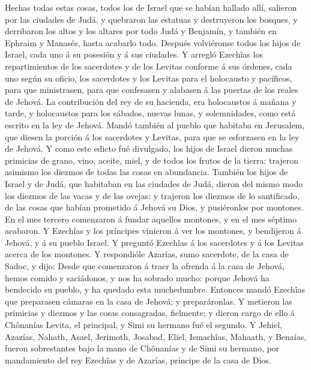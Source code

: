  Hechas todas estas cosas, todos los de Israel que se
habían hallado allí, salieron por las ciudades de Judá, y quebraron las
estatuas y destruyeron los bosques, y derribaron los altos y los altares
por todo Judá y Benjamín, y también en Ephraim y Manasés, hasta acabarlo
todo. Después volviéronse todos los hijos de Israel, cada uno á su
posesión y á sus ciudades.  Y arregló Ezechîas los
repartimientos de los sacerdotes y de los Levitas conforme á sus
órdenes, cada uno según su oficio, los sacerdotes y los Levitas para el
holocausto y pacíficos, para que ministrasen, para que confesasen y
alabasen á las puertas de los reales de Jehová.  La
contribución del rey de su hacienda, era holocaustos á mañana y tarde, y
holocaustos para los sábados, nuevas lunas, y solemnidades, como está
escrito en la ley de Jehová.  Mandó también al pueblo que
habitaba en Jerusalem, que diesen la porción á los sacerdotes y Levitas,
para que se esforzasen en la ley de Jehová.  Y como este
edicto fué divulgado, los hijos de Israel dieron muchas primicias de
grano, vino, aceite, miel, y de todos los frutos de la tierra: trajeron
asimismo los diezmos de todas las cosas en abundancia. 
También los hijos de Israel y de Judá, que habitaban en las ciudades de
Judá, dieron del mismo modo los diezmos de las vacas y de las ovejas: y
trajeron los diezmos de lo santificado, de las cosas que habían
prometido á Jehová su Dios, y pusiéronlos por montones. 
En el mes tercero comenzaron á fundar aquellos montones, y en el mes
séptimo acabaron.  Y Ezechîas y los príncipes vinieron á
ver los montones, y bendijeron á Jehová, y á su pueblo Israel.
 Y preguntó Ezechîas á los sacerdotes y á los Levitas
acerca de los montones.  Y respondióle Azarías, sumo
sacerdote, de la casa de Sadoc, y dijo: Desde que comenzaron á traer la
ofrenda á la casa de Jehová, hemos comido y saciádonos, y nos ha sobrado
mucho: porque Jehová ha bendecido su pueblo, y ha quedado esta
muchedumbre.  Entonces mandó Ezechîas que preparasen
cámaras en la casa de Jehová; y preparáronlas.  Y
metieron las primicias y diezmos y las cosas consagradas, fielmente; y
dieron cargo de ello á Chônanías Levita, el principal, y Simi su hermano
fué el segundo.  Y Jehiel, Azazías, Nahath, Asael,
Jerimoth, Josabad, Eliel, Ismachîas, Mahaath, y Benaías, fueron
sobrestantes bajo la mano de Chônanías y de Simi su hermano, por
mandamiento del rey Ezechîas y de Azarías, príncipe de la casa de Dios.
